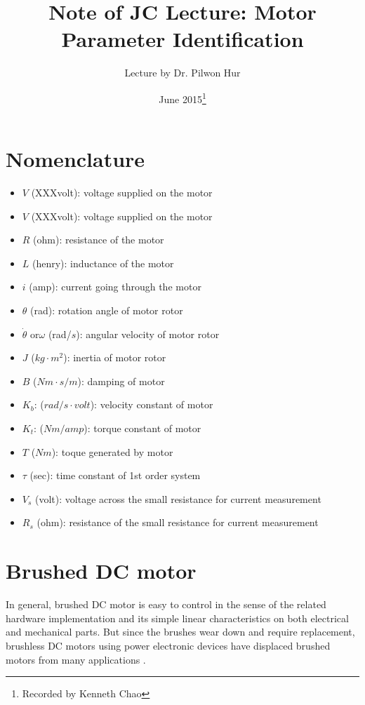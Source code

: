 \documentclass{article}
\title{Note of JC Lecture: Motor Parameter Identification}
\author{Lecture by Dr. Pilwon Hur}
\date{June 2015\footnote{Recorded by Kenneth Chao}}
\begin{document}
\maketitle

\section*{Nomenclature}
\begin{itemize}
\item[] $V$ (XXXvolt): voltage supplied on the motor
\item[] $V$ (XXXvolt): voltage supplied on the motor
\item[] $R$ (ohm): resistance of the motor
\item[] $L$ (henry): inductance of the motor
\item[] $i$ (amp): current going through the motor
\item[] $\theta$ (rad): rotation angle of motor rotor
\item[] $\dot\theta$ or$\omega$ (rad/$s$): angular velocity of motor rotor
\item[] $J$ ($kg\cdot m^2$): inertia of motor rotor
\item[] $B$ ($Nm\cdot s/m$): damping of motor
\item[] $K_b$: ($rad/s\cdot volt$): velocity constant of motor
\item[] $K_t$: ($Nm/amp$): torque constant of motor
\item[] $T$ ($Nm$): toque generated by motor
\item[] $\tau$ (sec): time constant of 1st order system
\item[] $V_s$ (volt): voltage across the small resistance for current measurement
\item[] $R_s$ (ohm): resistance of the small resistance for current measurement
\end{itemize}
\section{Brushed DC motor}
In general, brushed DC motor is easy to control in the sense of the related hardware implementation and its simple linear characteristics on both electrical and mechanical parts. But since the brushes wear down and require replacement, brushless DC motors using power electronic devices have displaced brushed motors from many applications \cite{WikiDCM}.
\end{document}
